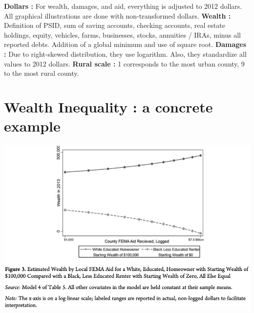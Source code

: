 \documentclass{beamer}
\begin{document}
    \begin{frame}{\secname}
        \textbf{Dollars :} For wealth, damages, and aid, everything is adjusted to 2012 dollars. All graphical illustrations are done with non-transformed dollars.
        \newline \hfill
        \newline \hfill
        \textbf{Wealth :} Definition of PSID, sum of saving accounts, checking accounts, real estate holdings, equity, vehicles,
        farms, businesses, stocks, annuities / IRAs, minus all reported debts. 
        Addition of a global minimum and use of square root.
        \newline \hfill
        \newline \hfill
        \textbf{Damages :} Due to right-skewed distribution, they use logarithm. Also, they standardize all values to 2012 dollars. 
        \newline \hfill
        \newline \hfill
        \textbf{Rural scale :} 1 corresponds to the most urban county, 9 to the most rural county. 
    \end{frame}


\section{Wealth Inequality : a concrete example}
    \begin{frame}{\secname}
        \includegraphics[totalheight=7cm,width=1\textwidth]{pictures/Figure_3.png}
    \end{frame}
\end{document}
